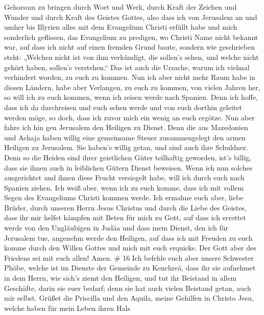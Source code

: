 Gehorsam zu bringen durch Wort und Werk,  durch Kraft der
Zeichen und Wunder und durch Kraft des Geistes Gottes, also dass ich von
Jerusalem an und umher bis Illyrien alles mit dem Evangelium Christi
erfüllt habe  und mich sonderlich geflissen, das Evangelium
zu predigen, wo Christi Name nicht bekannt war, auf dass ich nicht auf
einen fremden Grund baute,  sondern wie geschrieben steht:
„Welchen nicht ist von ihm verkündigt, die sollen's sehen, und welche
nicht gehört haben, sollen's verstehen.``  Das ist auch die
Ursache, warum ich vielmal verhindert worden, zu euch zu kommen.
 Nun ich aber nicht mehr Raum habe in diesen Ländern, habe
aber Verlangen, zu euch zu kommen, von vielen Jahren her, 
so will ich zu euch kommen, wenn ich reisen werde nach Spanien. Denn ich
hoffe, dass ich da durchreisen und euch sehen werde und von euch dorthin
geleitet werden möge, so doch, dass ich zuvor mich ein wenig an euch
ergötze.  Nun aber fahre ich hin gen Jerusalem den Heiligen
zu Dienst.  Denn die aus Mazedonien und Achaja haben willig
eine gemeinsame Steuer zusammengelegt den armen Heiligen zu Jerusalem.
 Sie haben's willig getan, und sind auch ihre Schuldner.
Denn so die Heiden sind ihrer geistlichen Güter teilhaftig geworden,
ist's billig, dass sie ihnen auch in leiblichen Gütern Dienst beweisen.
 Wenn ich nun solches ausgerichtet und ihnen diese Frucht
versiegelt habe, will ich durch euch nach Spanien ziehen. 
Ich weiß aber, wenn ich zu euch komme, dass ich mit vollem Segen des
Evangeliums Christi kommen werde.  Ich ermahne euch aber,
liebe Brüder, durch unseren Herrn Jesus Christus und durch die Liebe des
Geistes, dass ihr mir helfet kämpfen mit Beten für mich zu Gott,
 auf dass ich errettet werde von den Ungläubigen in Judäa
und dass mein Dienst, den ich für Jerusalem tue, angenehm werde den
Heiligen,  auf dass ich mit Freuden zu euch komme durch den
Willen Gottes und mich mit euch erquicke.  Der Gott aber
des Friedens sei mit euch allen! Amen. \# 16  Ich befehle
euch aber unsere Schwester Phöbe, welche ist im Dienste der Gemeinde zu
Kenchreä,  dass ihr sie aufnehmet in dem Herrn, wie sich's
ziemt den Heiligen, und tut ihr Beistand in allem Geschäfte, darin sie
euer bedarf; denn sie hat auch vielen Beistand getan, auch mir selbst.
 Grüßet die Priscilla und den Aquila, meine Gehilfen in
Christo Jesu,  welche haben für mein Leben ihren Hals
